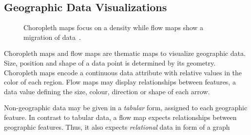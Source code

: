 \subsection{Geographic Data Visualizations}

\begin{figure}
  \centering
  \qquad
  \caption{Choropleth maps focus on a density while flow maps show a migration of data~\parencite{VisualizationCatalogue2017}.}%
  \label{fig:analysis:geographical}
\end{figure}

Choropleth maps and flow maps are thematic maps to visualize geographic data.
Size, position and shape of a data point is determined by its geometry.
Choropleth maps encode a continuous data attribute with relative values in the color of each region.
Flow maps may display relationships between features, a data value defining the size, colour, direction or shape of each arrow.

Non-geographic data may be given in a \emph{tabular} form, assigned to each geographic feature.
In contrast to tabular data, a flow map expects relationships between geographic features.
Thus, it also expects \emph{relational} data in form of a graph



